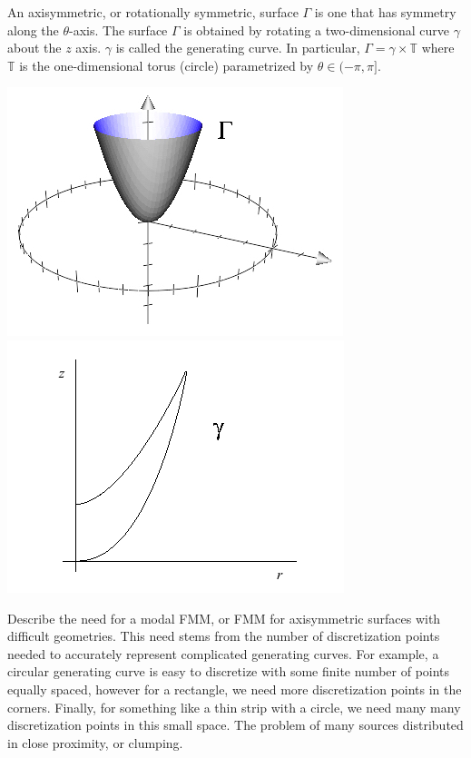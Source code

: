 \documentclass[11pt, oneside]{article}   	%
\begin{document}
An axisymmetric, or rotationally symmetric, surface $\Gamma$ is one that has symmetry along the $\theta$-axis. The surface $\Gamma$ is obtained by rotating a two-dimensional curve $\gamma$ about the $z$ axis. $\gamma$ is called the generating curve. In particular, $\Gamma=\gamma\times\mathbb{T}$ where $\mathbb{T}$ is the one-dimensional torus (circle) parametrized by $\theta\in(-\pi,\pi]$.
\begin{center}
\includegraphics[scale=0.5]{bowl3}
\includegraphics[scale=0.5]{bowl}
\end{center}
Describe the need for a modal FMM, or FMM for axisymmetric surfaces with difficult geometries. This need stems from the number of discretization points needed to accurately represent complicated generating curves. For example, a circular generating curve is easy to discretize with some finite number of points equally spaced, however for a rectangle, we need more discretization points in the corners. Finally, for something like a thin strip with a circle, we need many many discretization points in this small space. The problem of many sources distributed in close proximity, or clumping.
\end{document}
